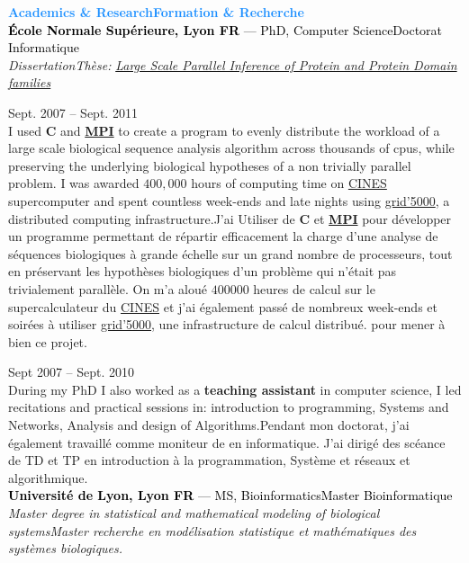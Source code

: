 \documentclass[a4paper]{article}
\newcommand\enfr[2]{\ifdefined\doen#1\else#2\fi\xspace}
\newcommand\cpplang{\textbf{C\raisebox{0.1em}{++}}\xspace}
\newcommand\mpi{\hyperlink{https://en.wikipedia.org/wiki/Message_Passing_Interface}{\textbf{MPI}}\xspace}
\newcommand\heading[1]{\Large\textsf{\textbf{\textcolor{DodgerBlue}{#1}}}\normalsize}
\newcommand\entry[2]{\large\textcolor{Black}{\textbf{#1} --- #2}\normalsize}
\newcommand\timespan[2]{\normalsize\textsf{#1 -- #2}}
\begin{document}
\pagebreak
\begin{minipage}[t]{0.63\textwidth}
\heading{\enfr{Academics \& Research}{Formation \& Recherche}}\\

\entry{École Normale Supérieure, Lyon\enfr{ FR}{}}{\enfr{PhD, Computer Science}{Doctorat Informatique}}\\
\textit{\enfr{Dissertation}{Thèse}:} \hyperlink{https://www.theses.fr/en/2011ENSL0643}{\textit{Large Scale Parallel Inference of Protein and Protein Domain families}}

\vspace{0.5em}
\timespan{Sept. 2007}{Sept. 2011}\\
\enfr{I used \cpplang and \mpi to create a program to evenly
distribute the workload of a large scale biological sequence analysis
algorithm across thousands of cpus, while preserving the underlying
biological hypotheses of a non trivially parallel problem. I was
awarded $400,000$ hours of computing time on
\hyperlink{https://www.cines.fr/en/supercomputing-2/}{CINES}
supercomputer and spent countless week-ends and late nights using
\hyperlink{https://www.grid5000.fr/w/Grid5000:Home}{grid'5000}, a
distributed computing infrastructure.}
{J'ai Utiliser de \cpplang et \mpi pour développer un programme
  permettant de répartir efficacement la charge d'une analyse de
  séquences biologiques à grande échelle sur un grand nombre de
  processeurs, tout en préservant les hypothèses biologiques d'un
  problème qui n'était pas trivialement parallèle. On m'a aloué $400
  000$ heures de calcul sur le supercalculateur du
  \hyperlink{https://www.cines.fr/en/supercomputing-2/}{CINES} et j'ai
  également passé de nombreux week-ends et soirées à utiliser
  \hyperlink{https://www.grid5000.fr/w/Grid5000:Home}{grid'5000}, une
  infrastructure de calcul distribué. pour mener à bien ce projet.}

\vspace{0.5em}
\timespan{Sept 2007}{Sept. 2010}\\
\enfr{During my PhD I also worked as a \textbf{teaching assistant} in computer
science, I led recitations and practical sessions in: introduction to
programming, Systems and Networks, Analysis and design of Algorithms.}
{Pendant mon doctorat, j'ai également travaillé comme moniteur de en
  informatique. J'ai dirigé des scéance de TD et TP en introduction à
  la programmation, Système et réseaux et algorithmique.}\\

\entry{Université de Lyon, Lyon\enfr{ FR}{}}{\enfr{MS, Bioinformatics}{Master Bioinformatique}}\\
\textit{\enfr{Master degree in statistical and mathematical modeling of biological
systems}{Master recherche en modélisation statistique et mathématiques des systèmes biologiques.}}


\end{minipage}
\end{document}
